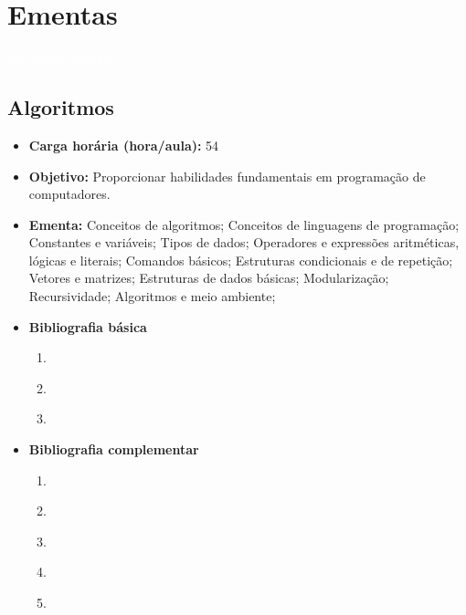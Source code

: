 \documentclass[11pt,fleqn]{book} %
\begin{document}
\chapter{Ementas}\label{ementas}
\vspace{6em}
\begin{flushright}
	\textit{\textcolor{white}{Um bonita citação...}}
\end{flushright}
\vspace{6em}



\newpage
\section{Algoritmos}\label{1_algoritmos}
\begin{itemize}
	\item \textbf{Carga horária (hora/aula):} 54
	\item \textbf{Objetivo:} Proporcionar habilidades fundamentais em programação de computadores.
	\item \textbf{Ementa:} 
	Conceitos de algoritmos;
	Conceitos de linguagens de programação;
	Constantes e variáveis;
	Tipos de dados;
	Operadores e expressões aritméticas, lógicas e literais; 
	Comandos básicos;
	Estruturas condicionais e de repetição;
	Vetores e matrizes;
	Estruturas de dados básicas;
	Modularização;
	Recursividade;
	Algoritmos e meio ambiente;
	\item \textbf{Bibliografia básica}
	\begin{enumerate}
		\item \cite{cormen2002algoritmos}
		\item \cite{silva2007estrutura}
		\item \cite{szwarcfiter1994estruturas}
	\end{enumerate}
	\item \textbf{Bibliografia complementar}
	\begin{enumerate}
		\item \cite{ascencio2010estruturas}
		\item \cite{lafore2004estruturas}
		\item \cite{manzano2010algoritmos}
		\item \cite{salvetti1998algoritmos}
		\item \cite{farrer1999algoritmos}
	\end{enumerate}	
\end{itemize}
\end{document}
